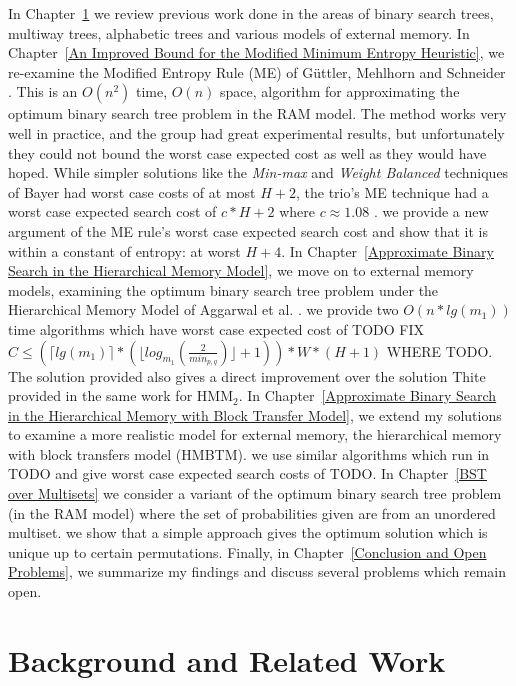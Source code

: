 \documentclass[letterpaper,12pt,titlepage,oneside,final]{book}
\theoremstyle{plain}
\begin{document}
In Chapter~\ref{Background and Related Work} we review previous work done in the areas of binary search trees, multiway trees, alphabetic trees and various models of external memory. In Chapter~\ref{An Improved Bound for the Modified Minimum Entropy Heuristic}, we re-examine the Modified Entropy Rule (ME) of G{\"u}ttler, Mehlhorn and Schneider \cite{guttler1980binary}. This is an $O(n^2)$ time, $O(n)$ space, algorithm for approximating the optimum binary search tree problem in the RAM model. The method works very well in practice, and the group had great experimental results, but unfortunately they could not bound the worst case expected cost as well as they would have hoped. While simpler solutions like the \textit{Min-max} and \textit{Weight Balanced} techniques of Bayer had worst case costs of at most $H+2$, the trio's ME technique had a worst case expected search cost of $c*H+2$ where $c \approx 1.08$ \cite{bayer1975improved} \cite{guttler1980binary}. we provide a new argument of the ME rule's worst case expected search cost and show that it is within a constant of entropy: at worst $H+4$. In Chapter~\ref{Approximate Binary Search in the Hierarchical Memory Model}, we move on to external memory models, examining the optimum binary search tree problem under the Hierarchical Memory Model of Aggarwal et al. \cite{aggarwal1987model} . we provide two $O(n*lg(m_1))$ time algorithms which have worst case expected cost of TODO FIX $C \leq (\lceil lg(m_1) \rceil * (\lfloor log_{m_1}(\frac{2}{min_{p,q}}) \rfloor + 1)) * W * (H + 1)$ WHERE TODO. The solution provided also gives a direct improvement over the solution Thite provided in the same work for HMM$_2$. In Chapter~\ref{Approximate Binary Search in the Hierarchical Memory with Block Transfer Model}, we extend my solutions to examine a more realistic model for external memory, the hierarchical memory with block transfers model (HMBTM). we use similar algorithms which run in TODO and give worst case expected search costs of TODO. In Chapter~\ref{BST over Multisets} we consider a variant of the optimum binary search tree problem (in the RAM model) where the set of probabilities given are from an unordered multiset. we show that a simple approach gives the optimum solution which is unique up to certain permutations. Finally, in Chapter~\ref{Conclusion and Open Problems}, we summarize my findings and discuss several problems which remain open.


\chapter{Background and Related Work} \label{Background and Related Work}
\end{document}
